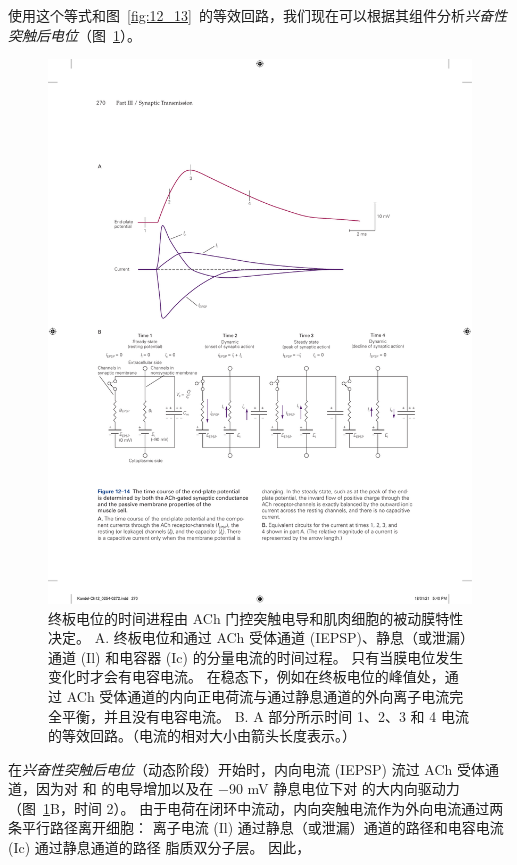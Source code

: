 使用这个等式和图~\ref{fig:12_13}~的等效回路，我们现在可以根据其组件分析\textit{兴奋性突触后电位}（图~\ref{fig:12_14}）。


\begin{figure}[htbp]
	\centering
	\includegraphics[width=0.95\linewidth]{chap12/fig_12_14}
	\caption{终板电位的时间进程由 ACh 门控突触电导和肌肉细胞的被动膜特性决定。 A. 终板电位和通过 ACh 受体通道 (IEPSP)、静息（或泄漏）通道 (Il) 和电容器 (Ic) 的分量电流的时间过程。 只有当膜电位发生变化时才会有电容电流。 在稳态下，例如在终板电位的峰值处，通过 ACh 受体通道的内向正电荷流与通过静息通道的外向离子电流完全平衡，并且没有电容电流。 B. A 部分所示时间 1、2、3 和 4 电流的等效回路。（电流的相对大小由箭头长度表示。）}
	\label{fig:12_14}
\end{figure}


在\textit{兴奋性突触后电位}（动态阶段）开始时，内向电流 (IEPSP) 流过 ACh 受体通道，因为对  和  的电导增加以及在 −90 mV 静息电位下对  的大内向驱动力 （图~\ref{fig:12_14}B，时间 2）。
由于电荷在闭环中流动，内向突触电流作为外向电流通过两条平行路径离开细胞：
离子电流 (Il) 通过静息（或泄漏）通道的路径和电容电流 (Ic) 通过静息通道的路径 脂质双分子层。
因此，


